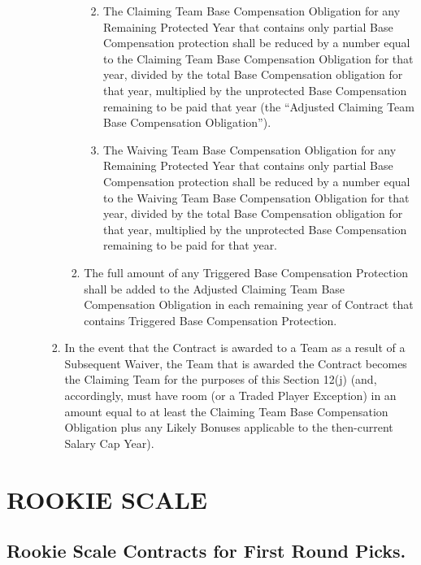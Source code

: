 \documentclass[
]{book}
\providecommand{\tightlist}{%
  \setlength{\itemsep}{0pt}\setlength{\parskip}{0pt}}
\begin{document}
\begin{enumerate}
\begin{enumerate}
\begin{enumerate}
\begin{enumerate}
        \begin{enumerate}
        \def\labelenumv{(\arabic{enumv})}
        \tightlist
        \item
          The Claiming Team Base Compensation Obligation for any Remaining Protected Year that contains only partial Base Compensation protection shall be reduced by a number equal to the Claiming Team Base Compensation Obligation for that year, divided by the total Base Compensation obligation for that year, multiplied by the unprotected Base Compensation remaining to be paid that year (the ``Adjusted Claiming Team Base Compensation Obligation'').
        \item
          The Waiving Team Base Compensation Obligation for any Remaining Protected Year that contains only partial Base Compensation protection shall be reduced by a number equal to the Waiving Team Base Compensation Obligation for that year, divided by the total Base Compensation obligation for that year, multiplied by the unprotected Base Compensation remaining to be paid for that year.
        \end{enumerate}
      \item
        The full amount of any Triggered Base Compensation Protection shall be added to the Adjusted Claiming Team Base Compensation Obligation in each remaining year of Contract that contains Triggered Base Compensation Protection.
      \end{enumerate}
    \item
      In the event that the Contract is awarded to a Team as a result of a Subsequent Waiver, the Team that is awarded the Contract becomes the Claiming Team for the purposes of this Section 12(j) (and, accordingly, must have room (or a Traded Player Exception) in an amount equal to at least the Claiming Team Base Compensation Obligation plus any Likely Bonuses applicable to the then-current Salary Cap Year).
    \end{enumerate}
  \end{enumerate}
\end{enumerate}

\hypertarget{rookie-scale}{%
\chapter{ROOKIE SCALE}\label{rookie-scale}}

\hypertarget{rookie-scale-contracts-for-first-round-picks.}{%
\section{Rookie Scale Contracts for First Round Picks.}\label{rookie-scale-contracts-for-first-round-picks.}}
\end{document}
